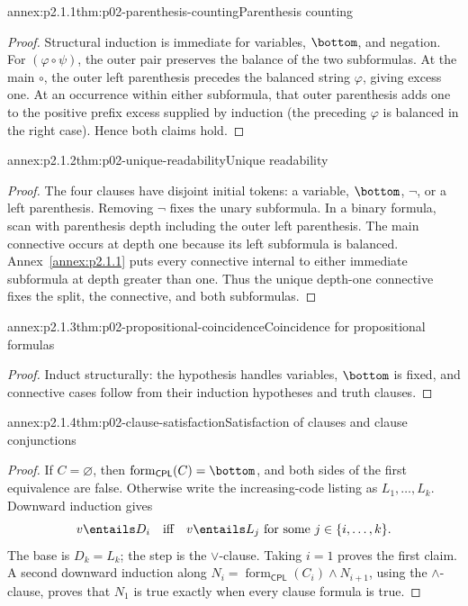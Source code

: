 
\begin{annexitem}{annex:p2.1.1}{thm:p02-parenthesis-counting}{Parenthesis counting}
\begin{proof}
Structural induction is immediate for variables, \(\bottom\), and negation.
For \((\varphi\circ\psi)\), the outer pair preserves the balance of the two
subformulas.  At the main \(\circ\), the outer left parenthesis precedes the
balanced string \(\varphi\), giving excess one.  At an occurrence within
either subformula, that outer parenthesis adds one to the positive prefix
excess supplied by induction (the preceding \(\varphi\) is balanced in the
right case).  Hence both claims hold.
\end{proof}
\end{annexitem}

\begin{annexitem}{annex:p2.1.2}{thm:p02-unique-readability}{Unique readability}
\begin{proof}
The four clauses have disjoint initial tokens: a variable, \(\bottom\),
\(\neg\), or a left parenthesis.  Removing \(\neg\) fixes the unary
subformula.  In a binary formula, scan with parenthesis depth including the
outer left parenthesis.  The main connective occurs at depth one because its
left subformula is balanced.  Annex~\ref{annex:p2.1.1} puts every connective
internal to either immediate subformula at depth greater than one.  Thus the
unique depth-one connective fixes the split, the connective, and both
subformulas.
\end{proof}
\end{annexitem}

\begin{annexitem}{annex:p2.1.3}{thm:p02-propositional-coincidence}{Coincidence for propositional formulas}
\begin{proof}
Induct structurally: the hypothesis handles variables, \(\bottom\) is fixed,
and connective cases follow from their induction hypotheses and truth clauses.
\end{proof}
\end{annexitem}

\begin{annexitem}{annex:p2.1.4}{thm:p02-clause-satisfaction}{Satisfaction of clauses and clause conjunctions}
\begin{proof}
If \(C=\varnothing\), then
\(\operatorname{form}_{\mathsf{CPL}}(C)=\bottom\), and both sides of the
first equivalence are false.  Otherwise write the increasing-code listing as
\(L_1,\ldots,L_k\).  Downward induction gives
\[
 v\entails D_i\quad\text{iff}\quad
 v\entails L_j\text{ for some }j\in\{i,\ldots,k\}.
\]
The base is \(D_k=L_k\); the step is the \(\lor\)-clause.  Taking \(i=1\)
proves the first claim.  A second downward induction along
\(N_i=\operatorname{form}_{\mathsf{CPL}}(C_i)\land N_{i+1}\), using the
\(\land\)-clause, proves that \(N_1\) is true exactly when every clause
formula is true.
\end{proof}
\end{annexitem}

